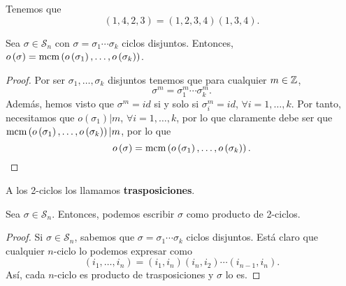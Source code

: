 \begin{eg}
Tenemos que
\[\left(1,4,2,3\right) = \left(1,2,3,4\right)\left(1,3,4\right) .\]
\end{eg}
\begin{prop}
Sea $\displaystyle \sigma \in \mathcal{S}_{n} $ con $\displaystyle \sigma = \sigma_{1} \cdots \sigma _{k} $ ciclos disjuntos. Entonces, $\displaystyle o\left(\sigma \right) = \text{mcm}\left(o\left(\sigma_{1}\right), \ldots, o\left(\sigma_{k}\right)\right) $. 
\end{prop}
\begin{proof}
Por ser $\displaystyle \sigma_{1}, \ldots, \sigma_{k} $ disjuntos tenemos que para cualquier $\displaystyle m \in \mathbb{Z} $,
\[\sigma^{m} = \sigma^{m}_{1} \cdots \sigma^{m}_{k} .\]
Además, hemos visto que $\displaystyle \sigma^{m} = id $ si y solo si $\displaystyle \sigma^{m}_{i} = id $, $\displaystyle \forall i = 1, \ldots, k $. Por tanto, necesitamos que $\displaystyle o\left(\sigma_{1}\right) |m $, $\displaystyle \forall i = 1, \ldots, k $, por lo que claramente debe ser que $\displaystyle \text{mcm}\left(o\left(\sigma_{1}\right), \ldots, o\left(\sigma_{k}\right)\right) | m $, por lo que 
\[o\left(\sigma \right) = \text{mcm}\left(o\left(\sigma_{1}\right), \ldots, o\left(\sigma_{k}\right)\right) .\]
\end{proof}
\begin{definition}[Trasposiciones]
A los 2-ciclos los llamamos \textbf{trasposiciones}.
\end{definition}

\begin{colorary}
Sea $\displaystyle \sigma \in \mathcal{S}_{n} $. Entonces, podemos escribir $\displaystyle \sigma  $ como producto de 2-ciclos.	
\end{colorary}
 \begin{proof}
Si $\displaystyle \sigma \in \mathcal{S}_{n} $, sabemos que $\displaystyle \sigma = \sigma_{1} \cdots \sigma_{k} $ ciclos disjuntos. Está claro que cualquier $\displaystyle n $-ciclo lo podemos expresar como 
\[\left(i_{1}, \ldots, i_{n}\right) = \left(i_{1}, i_{n}\right)\left(i_{n}, i_{2}\right) \cdots \left(i_{n-1}, i_{n}\right) .\]
Así, cada $\displaystyle n $-ciclo es producto de trasposiciones y $\displaystyle \sigma  $ lo es.
 \end{proof}
 
